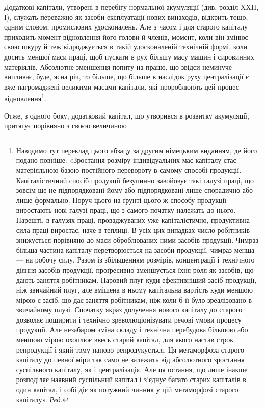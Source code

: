 Додаткові капітали, утворені в перебігу нормальної акумуляції
(див. розділ XXII, І), служать переважно як засоби
експлуатації нових винаходів, відкрить тощо, одним словом,
промислових удосконалень. Але з часом і для старого капіталу
приходить момент відновлення його голови й членів, момент,
коли він змінює свою шкуру й теж відроджується в такій удосконаленій
технічній формі, коли досить меншої маси праці,
щоб пускати в рух більшу масу машин і сировинних матеріялів.
Абсолютне зменшення попиту на працю, що звідси неминуче
випливає, буде, ясна річ, то більше, що більше в наслідок руху
централізації є вже нагромаджені великими масами капітали,
які пророблюють цей процес відновлення\footnote*{
Наводимо тут переклад цього абзацу за другим німецьким виданням,
де його подано повніше: «Зростання розміру індивідуальних мас
капіталу стає матеріяльною базою постійного перевороту в самому способі
продукції. Капіталістичний спосіб продукції безупинно завойовує
такі галузі праці, що зовсім ще не підпорядковані йому або підпорядковані
лише спорадично або лише формально. Поруч цього на ґрунті
цього ж способу продукції виростають нові галузі праці, що з самого початку
належать до нього. Нарешті, в галузях праці, проваджуваних
уже капіталістично, продуктивна сила праці виростає, наче в теплиці.
В усіх цих випадках число робітників знижується порівняно до маси
оброблюваних ними засобів продукції. Чимраз більша частина капіталу
перетворюється на засоби продукції, чимраз менша — на робочу силу.
Разом із збільшенням розмірів, концентрації і технічного діяння
засобів продукції, проґресивно зменшується їхня роля як засобів, що
дають заняття робітникам. Паровий плуг куди ефективніший засіб продукції,
ніж звичайний плуг, але вмішена в ньому капітальна вартість
куди меншою мірою є засіб, що дає заняття робітникам, ніж коли б її
було зреалізовано в звичайному плузі. Спочатку якраз долучення нового
капіталу до старого дозволяє поширити і технічно зреволюціонізувати
речові умови процесу продукції. Але незабаром зміна складу і технічна
перебудова більшою або меншою мірою охоплює ввесь старий капітал,
для якого настав строк репродукції і який тому наново репродукується.
Ця метаморфоза старого капіталу до певної міри так само не залежить від
абсолютного зростання суспільного капіталу, як і централізація. Але ця
остання, що лише інакше розподіляє наявний суспільний капітал і з’єднує
багато старих капіталів в один капітал, і собі діє як потужний чинник
у цій метаморфозі старого капіталу». \emph{Ред.}
}.

Отже, з одного боку, додатковий капітал, що утворився в
розвитку акумуляції, притягує порівняно з своєю величиною
\parbreak{}  %
